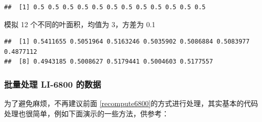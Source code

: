 \documentclass[
]{krantz}
\makeatletter
\newenvironment{Shaded}{\begin{snugshade}}{\end{snugshade}}
\newcommand{\DataTypeTok}[1]{\textcolor[rgb]{0.13,0.29,0.53}{#1}}
\newcommand{\DecValTok}[1]{\textcolor[rgb]{0.00,0.00,0.81}{#1}}
\newcommand{\FloatTok}[1]{\textcolor[rgb]{0.00,0.00,0.81}{#1}}
\newcommand{\KeywordTok}[1]{\textcolor[rgb]{0.13,0.29,0.53}{\textbf{#1}}}
\newcommand{\NormalTok}[1]{#1}
\newcommand{\OperatorTok}[1]{\textcolor[rgb]{0.81,0.36,0.00}{\textbf{#1}}}
\newcommand{\StringTok}[1]{\textcolor[rgb]{0.31,0.60,0.02}{#1}}
\newenvironment{kframe}{%
\medskip{}
\setlength{\fboxsep}{.8em}
 \def\at@end@of@kframe{}%
 \ifinner\ifhmode%
  \def\at@end@of@kframe{\end{minipage}}%
  \begin{minipage}{\columnwidth}%
 \fi\fi%
 \def\FrameCommand##1{\hskip\@totalleftmargin \hskip-\fboxsep
 \colorbox{shadecolor}{##1}\hskip-\fboxsep
     \hskip-\linewidth \hskip-\@totalleftmargin \hskip\columnwidth}%
 \MakeFramed {\advance\hsize-\width
   \@totalleftmargin\z@ \linewidth\hsize
   \@setminipage}}%
 {\par\unskip\endMakeFramed%
 \at@end@of@kframe}
\renewenvironment{Shaded}{\begin{kframe}}{\end{kframe}}
\makeatother
\begin{document}
\begin{verbatim}
##  [1] 0.5 0.5 0.5 0.5 0.5 0.5 0.5 0.5 0.5 0.5 0.5 0.5
\end{verbatim}

模拟 12 个不同的叶面积，均值为 3，方差为 0.1

\begin{Shaded}
\end{Shaded}

\begin{verbatim}
##  [1] 0.5411655 0.5051964 0.5163246 0.5035902 0.5086884 0.5083977 0.4877112
##  [8] 0.4943185 0.5008627 0.5179441 0.5004603 0.5177557
\end{verbatim}

\hypertarget{batch-6800-xlsx}{%
\subsubsection{批量处理 LI-6800 的数据}\label{batch-6800-xlsx}}

为了避免麻烦，不再建议前面 \ref{recompute6800}的方式进行处理，其实基本的代码处理也很简单，例如下面演示的一些方法，供参考：
\end{document}
